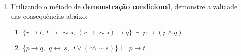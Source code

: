\documentclass[12pt, a4paper,final]{article}
\begin{document}
\begin{enumerate}
\begin{enumerate}








\end{enumerate}


 \item Utilizando o m\'etodo de {\bf demonstra\c c\~ao condicional}, demonstre a validade das consequ\^encias abaixo:
 
\begin{enumerate}


\item $\{r \rightarrow t, ~ t \rightarrow ~ \sim s,
   ~ (r \rightarrow \sim s) \rightarrow q \} ~\vdash~  p \rightarrow (p \wedge q) $ 


\item $\{p \rightarrow q, \:\: q \leftrightarrow ~ s, \:\: t \vee (r \wedge \sim s) \} ~\vdash~ p \rightarrow t $ 




\end{enumerate}
\end{enumerate}
\end{document}
